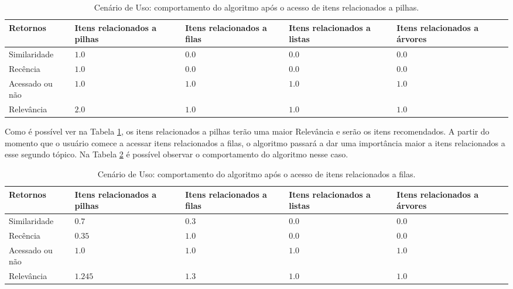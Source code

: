 \begin{table}[h]
\footnotesize
\caption[Cenário de Uso: comportamento do algoritmo após o acesso de itens relacionados a pilhas.]{Cenário de Uso: comportamento do algoritmo após o acesso de itens relacionados a pilhas.}
\label{tab:cenario-de-uso-1}
\centering
\begin{tabular}{|p{2cm}|p{2.5cm}|p{2.5cm}|p{2.5cm}|p{2.5cm}|}
  \hline
  \textbf{Retornos} & \textbf{Itens relacionados a pilhas} & \textbf{Itens relacionados a filas} & \textbf{Itens relacionados a listas} & \textbf{Itens relacionados a árvores} \\
  \hline
  Similaridade & $1.0$ & $0.0$ & $0.0$ & $0.0$ \\
  \hline
  Recência & $1.0$ & $0.0$ & $0.0$ & $0.0$ \\
  \hline
  Acessado ou não & $1.0$ & $1.0$ & $1.0$ & $1.0$ \\
  \hline
  Relevância & $2.0$ & $1.0$ & $1.0$ & $1.0$ \\
  \hline
\end{tabular}
\end{table}

Como é possível ver na Tabela \ref{tab:cenario-de-uso-1}, os itens relacionados a pilhas terão uma maior
Relevância e serão os itens recomendados. A partir do momento que o usuário comece a acessar itens relacionados a filas,
o algoritmo passará a dar uma importância maior a itens relacionados a esse segundo tópico. Na Tabela
\ref{tab:cenario-de-uso-2} é possível observar o comportamento do algoritmo nesse caso.

\begin{table}[h]
\footnotesize
\caption[Cenário de Uso: comportamento do algoritmo após o acesso de itens relacionados a filas.]{Cenário de Uso: comportamento do algoritmo após o acesso de itens relacionados a filas.}
\label{tab:cenario-de-uso-2}
\centering
\begin{tabular}{|p{2cm}|p{2.5cm}|p{2.5cm}|p{2.5cm}|p{2.5cm}|}
  \hline
  \textbf{Retornos} & \textbf{Itens relacionados a pilhas} & \textbf{Itens relacionados a filas} & \textbf{Itens relacionados a listas} & \textbf{Itens relacionados a árvores} \\
  \hline
  Similaridade & $0.7$ & $0.3$ & $0.0$ & $0.0$ \\
  \hline
  Recência & $0.35$ & $1.0$ & $0.0$ & $0.0$ \\
  \hline
  Acessado ou não & $1.0$ & $1.0$ & $1.0$ & $1.0$ \\
  \hline
  Relevância & $1.245$ & $1.3$ & $1.0$ & $1.0$ \\
  \hline
\end{tabular}
\end{table}

